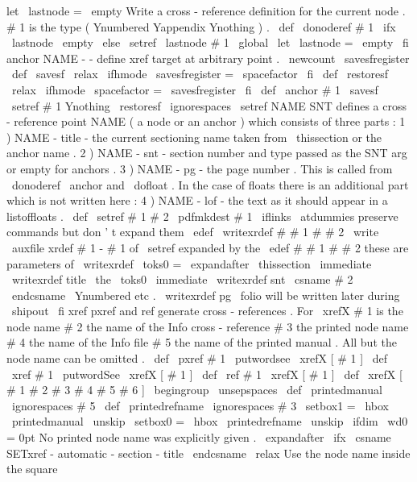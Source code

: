 {let
\
lastnode
=
\
empty
%
Write
a
cross
-
reference
definition
for
the
current
node
.
#
1
is
the
%
type
(
Ynumbered
Yappendix
Ynothing
)
.
%
\
def
\
donoderef
#
1
{
%
\
ifx
\
lastnode
\
empty
\
else
\
setref
{
\
lastnode
}
{
#
1
}
%
\
global
\
let
\
lastnode
=
\
empty
\
fi
}
%
anchor
{
NAME
}
-
-
define
xref
target
at
arbitrary
point
.
%
\
newcount
\
savesfregister
%
\
def
\
savesf
{
\
relax
\
ifhmode
\
savesfregister
=
\
spacefactor
\
fi
}
\
def
\
restoresf
{
\
relax
\
ifhmode
\
spacefactor
=
\
savesfregister
\
fi
}
\
def
\
anchor
#
1
{
\
savesf
\
setref
{
#
1
}
{
Ynothing
}
\
restoresf
\
ignorespaces
}
%
\
setref
{
NAME
}
{
SNT
}
defines
a
cross
-
reference
point
NAME
(
a
node
or
an
%
anchor
)
which
consists
of
three
parts
:
%
1
)
NAME
-
title
-
the
current
sectioning
name
taken
from
\
thissection
%
or
the
anchor
name
.
%
2
)
NAME
-
snt
-
section
number
and
type
passed
as
the
SNT
arg
or
%
empty
for
anchors
.
%
3
)
NAME
-
pg
-
the
page
number
.
%
%
This
is
called
from
\
donoderef
\
anchor
and
\
dofloat
.
In
the
case
of
%
floats
there
is
an
additional
part
which
is
not
written
here
:
%
4
)
NAME
-
lof
-
the
text
as
it
should
appear
in
a
listoffloats
.
%
\
def
\
setref
#
1
#
2
{
%
\
pdfmkdest
{
#
1
}
%
\
iflinks
{
%
\
atdummies
%
preserve
commands
but
don
'
t
expand
them
\
edef
\
writexrdef
#
#
1
#
#
2
{
%
\
write
\
auxfile
{
xrdef
{
#
1
-
%
#
1
of
\
setref
expanded
by
the
\
edef
#
#
1
}
{
#
#
2
}
}
%
these
are
parameters
of
\
writexrdef
}
%
\
toks0
=
\
expandafter
{
\
thissection
}
%
\
immediate
\
writexrdef
{
title
}
{
\
the
\
toks0
}
%
\
immediate
\
writexrdef
{
snt
}
{
\
csname
#
2
\
endcsname
}
%
\
Ynumbered
etc
.
\
writexrdef
{
pg
}
{
\
folio
}
%
will
be
written
later
during
\
shipout
}
%
\
fi
}
%
xref
pxref
and
ref
generate
cross
-
references
.
For
\
xrefX
#
1
is
%
the
node
name
#
2
the
name
of
the
Info
cross
-
reference
#
3
the
printed
%
node
name
#
4
the
name
of
the
Info
file
#
5
the
name
of
the
printed
%
manual
.
All
but
the
node
name
can
be
omitted
.
%
\
def
\
pxref
#
1
{
\
putwordsee
{
}
\
xrefX
[
#
1
]
}
\
def
\
xref
#
1
{
\
putwordSee
{
}
\
xrefX
[
#
1
]
}
\
def
\
ref
#
1
{
\
xrefX
[
#
1
]
}
\
def
\
xrefX
[
#
1
#
2
#
3
#
4
#
5
#
6
]
{
\
begingroup
\
unsepspaces
\
def
\
printedmanual
{
\
ignorespaces
#
5
}
%
\
def
\
printedrefname
{
\
ignorespaces
#
3
}
%
\
setbox1
=
\
hbox
{
\
printedmanual
\
unskip
}
%
\
setbox0
=
\
hbox
{
\
printedrefname
\
unskip
}
%
\
ifdim
\
wd0
=
0pt
%
No
printed
node
name
was
explicitly
given
.
\
expandafter
\
ifx
\
csname
SETxref
-
automatic
-
section
-
title
\
endcsname
\
relax
%
Use
the
node
name
inside
the
square
}}
